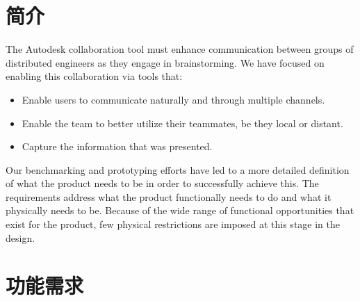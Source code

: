 


\section*{简介}

The Autodesk collaboration tool must enhance communication between groups of distributed engineers as they engage in brainstorming.  We have focused on enabling this collaboration via tools that:

\begin{itemize}\tightlist
\item Enable users to communicate naturally and through multiple channels.
\item Enable the team to better utilize their teammates, be they local or distant.
\item Capture the information that was presented.
\end{itemize}

Our benchmarking and prototyping efforts have led to a more detailed definition of what the product needs to be in order to successfully achieve this.  The requirements address what the product functionally needs to do and what it physically needs to be. Because of the wide range of functional opportunities that exist for the product, few physical restrictions are imposed at this stage in the design. 

\section{功能需求}
\label{sec:functionalreqs}

